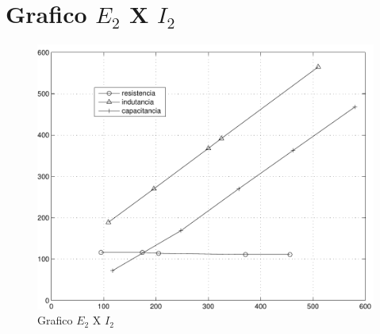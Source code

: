 \documentclass[paper=a4, fontsize=11pt]{article}
\begin{document}
\section{Grafico $E_2$ X $I_2$}

\begin{figure}[!ht]
    \begin{center}
    \includegraphics[scale=.6]{e2e2.pdf}
    \caption{Grafico $E_2$ X $I_2$}
    \end{center}
\end{figure}
\end{document}
